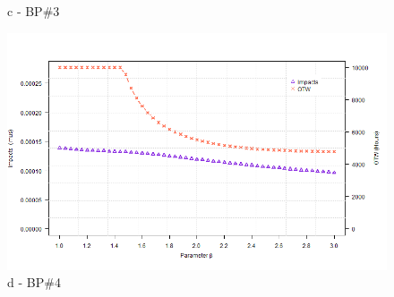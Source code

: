 \begin{figure}[!htb]
\begin{minipage}[b]{0.5\linewidth}
		\caption*{c - BP\#3}
	\end{minipage}
	\hspace{0.05cm}
	\begin{minipage}[b]{0.5\linewidth}
		\centering
		\includegraphics[width=\textwidth]{figures/ch05_fig_betasa_pump4}
		\caption*{d - BP\#4}
	\end{minipage}


\end{figure}

